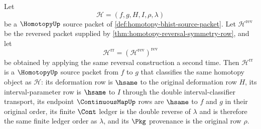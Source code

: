\begin{theorem}
\label{thm:homotopy-double-reversal-classifier-row}
Let
$$
\mathcal H=(f,g,H,I,\rho,\lambda)
$$
be a $\HomotopyUp$ source packet of \autoref{def:homotopy-bhist-source-packet}. Let $\mathcal H^{\mathrm{rev}}$ be the reversed packet supplied by \autoref{thm:homotopy-reversal-symmetry-row}, and let
$$
\mathcal H^{\mathrm{rr}}=(\mathcal H^{\mathrm{rev}})^{\mathrm{rev}}
$$
be obtained by applying the same reversal construction a second time. Then $\mathcal H^{\mathrm{rr}}$ is a $\HomotopyUp$ source packet from $f$ to $g$ that classifies the same homotopy object as $\mathcal H$: its deformation row is $\hsame$ to the original deformation row $H$, its interval-parameter row is $\hsame$ to $I$ through the double interval-classifier transport, its endpoint $\ContinuousMapUp$ rows are $\hsame$ to $f$ and $g$ in their original order, its finite $\Cont$ ledger is the double reverse of $\lambda$ and is therefore the same finite ledger order as $\lambda$, and its $\Pkg$ provenance is the original row $\rho$.
\end{theorem}
